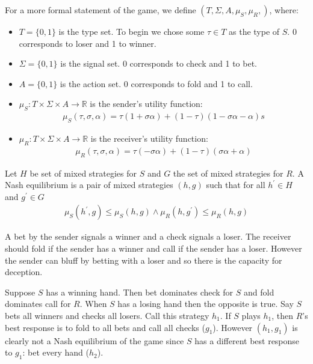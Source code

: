 \documentclass{article}
\begin{document}
For a more formal statement of the game, we define $\left(T, \Sigma, A, \mu_S, \mu_R, \right)$, where:
\begin{itemize}
    \item $T = \lbrace 0, 1 \rbrace$ is the type set. To begin we chose some $\tau \in T$ as the type of $S$. 0 corresponds to loser and 1 to winner.
    \item $\Sigma = \lbrace 0, 1 \rbrace$ is the signal set. 0 corresponds to check and 1 to bet.
        \item $A = \lbrace 0, 1 \rbrace$ is the action set. 0 corresponds to fold and 1 to call.
    \item $\mu_S: T \times \Sigma \times A \longrightarrow \mathbb{R}$ is the sender's utility function:
        \begin{align*}
\mu_S(\tau, \sigma, \alpha) = \tau(1+\sigma\alpha) + (1-\tau)(1-\sigma\alpha-\alpha)s
        \end{align*}
    \item $\mu_R: T \times \Sigma \times A \longrightarrow \mathbb{R}$ is the receiver's utility function:
        \begin{align*}
\mu_R(\tau, \sigma, \alpha) = \tau(-\sigma\alpha) + (1-\tau)(\sigma\alpha+\alpha)
        \end{align*}
\end{itemize}

Let $H$ be set of mixed strategies for $S$ and $G$ the set of mixed strategies for $R$. A Nash equilibrium is a pair of mixed strategies $(h,g)$ such that for all $h^\prime \in H$ and $g^\prime \in G$
\begin{align*}
    \mu_S(h^\prime,g) \le \mu_S(h,g) \land
    \mu_R(h,g^\prime) \le \mu_R(h,g)
\end{align*}

A bet by the sender signals a winner and a check signals a loser. The receiver should fold if the sender has a winner and call if the sender has a loser. However the sender can bluff by betting with a loser and so there is the capacity for deception.

Suppose $S$ has a winning hand. Then bet dominates check for $S$ and fold dominates call for $R$. When $S$ has a losing hand then the opposite is true. Say $S$ bets all winners and checks all losers. Call this strategy $h_1$. If $S$ plays $h_1$, then $R$'s best response is to fold to all bets and call all checks ($g_1$). However $(h_1, g_1)$ is clearly not a Nash equilibrium of the game since $S$ has a different best response to $g_1$: bet every hand ($h_2$).
\end{document}
